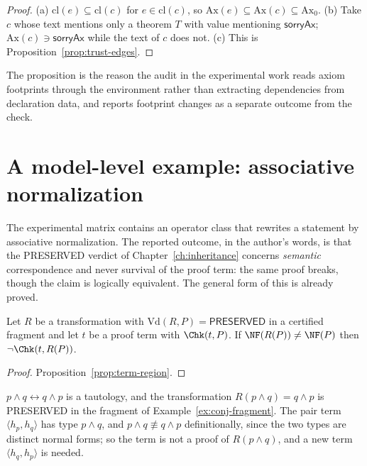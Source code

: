 \begin{proof}
(a) $\mathrm{cl}(e)\subseteq\mathrm{cl}(c)$ for $e\in\mathrm{cl}(c)$, so $\mathrm{Ax}(e)\subseteq\mathrm{Ax}(c)\subseteq\mathrm{Ax}_0$. (b) Take $c$ whose text mentions only a theorem $T$ with value mentioning $\mathsf{sorryAx}$; $\mathrm{Ax}(c)\ni\mathsf{sorryAx}$ while the text of $c$ does not. (c) This is Proposition~\ref{prop:trust-edges}.
\end{proof}

The proposition is the reason the audit in the experimental work reads axiom footprints through the environment rather than extracting dependencies from declaration data, and reports footprint changes as a separate outcome from the check.

\section{A model-level example: associative normalization}

The experimental matrix contains an operator class that rewrites a statement by associative normalization. The reported outcome, in the author's words, is that the \textsf{PRESERVED} verdict of Chapter~\ref{ch:inheritance} concerns \emph{semantic} correspondence and never survival of the proof term: the same proof breaks, though the claim is logically equivalent. The general form of this is already proved.

\begin{proposition}
\label{prop:preserved-not-surviving}
Let $R$ be a transformation with $\mathrm{Vd}(R,P)=\textsf{PRESERVED}$ in a certified fragment and let $t$ be a proof term with $\Chk(t,P)$. If $\NF(R(P))\ne\NF(P)$ then $\neg\Chk(t,R(P))$.
\end{proposition}

\begin{proof}
Proposition~\ref{prop:term-region}.
\end{proof}

\begin{example}
$p\wedge q\leftrightarrow q\wedge p$ is a tautology, and the transformation $R(p\wedge q)=q\wedge p$ is \textsf{PRESERVED} in the fragment of Example~\ref{ex:conj-fragment}. The pair term $\langle h_p,h_q\rangle$ has type $p\wedge q$, and $p\wedge q\not\equiv q\wedge p$ definitionally, since the two types are distinct normal forms; so the term is not a proof of $R(p\wedge q)$, and a new term $\langle h_q,h_p\rangle$ is needed.
\end{example}

